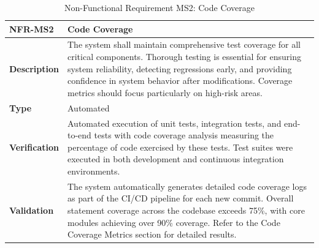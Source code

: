 \documentclass[12pt, titlepage]{article}
\begin{document}
\begin{table}[H]
\centering
{}
\begin{tabular}{|p{3.5cm}|p{11.5cm}|}
\hline
\rowcolor{gray!30}
\textbf{NFR-MS2} & \textbf{Code Coverage} \\
\hline
\textbf{Description} & The system shall maintain comprehensive test coverage for all critical components. Thorough testing is essential for ensuring system reliability, detecting regressions early, and providing confidence in system behavior after modifications. Coverage metrics should focus particularly on high-risk areas. \\
\hline
\textbf{Type} & Automated \\
\hline
\textbf{Verification} & Automated execution of unit tests, integration tests, and end-to-end tests with code coverage analysis measuring the percentage of code exercised by these tests. Test suites were executed in both development and continuous integration environments. \\
\hline
\textbf{Validation} & The system automatically generates detailed code coverage logs as part of the CI/CD pipeline for each new commit. Overall statement coverage across the codebase exceeds 75\%, with core modules achieving over 90\% coverage. Refer to the Code Coverage Metrics section for detailed results. \\
\hline
\end{tabular}
\caption{Non-Functional Requirement MS2: Code Coverage}
\end{table}
\end{document}
